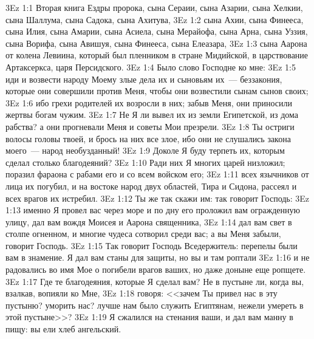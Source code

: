 \vs 3Ez 1:1 Вторая книга Ездры пророка, сына Сераии, сына Азарии, сына Хелкии, сына Шаллума, сына Садока, сына Ахитува,
\vs 3Ez 1:2 сына Ахии, сына Финееса, сына Илия, сына Амарии, сына Асиела, сына Мерайофа, сына Арна, сына Уззия, сына Ворифа, сына Авишуя, сына Финееса, сына Елеазара,
\vs 3Ez 1:3 сына Аарона от колена Левиина, который был пленником в стране Мидийской, в царствование Артаксеркса, царя Персидского.
\rsbpar\vs 3Ez 1:4 Было слово Господне ко мне:
\vs 3Ez 1:5 иди и возвести народу Моему злые дела их и сыновьям их~--- беззакония, которые они совершили против Меня, чтобы они возвестили сынам сынов своих;
\vs 3Ez 1:6 ибо грехи родителей их возросли в них; забыв Меня, они приносили жертвы богам чужим.
\vs 3Ez 1:7 Не Я ли вывел их из земли Египетской, из дома рабства? а они прогневали Меня и советы Мои презрели.
\vs 3Ez 1:8 Ты остриги волосы головы твоей, и брось на них все злое, ибо они не слушались закона моего~--- народ необузданный!
\vs 3Ez 1:9 Доколе Я буду терпеть их, которым сделал столько благодеяний?
\vs 3Ez 1:10 Ради них Я многих царей низложил; поразил фараона с рабами его и со всем войском его;
\vs 3Ez 1:11 всех язычников от лица их погубил, и на востоке народ двух областей, Тира и Сидона, рассеял и всех врагов их истребил.
\vs 3Ez 1:12 Ты же так скажи им: так говорит Господь:
\vs 3Ez 1:13 именно Я провел вас через море и по дну его проложил вам огражденную улицу, дал вам вождя Моисея и Аарона священника,
\vs 3Ez 1:14 дал вам свет в столпе огненном, и многие чудеса сотворил среди вас; а вы Меня забыли, говорит Господь.
\rsbpar\vs 3Ez 1:15 Так говорит Господь Вседержитель: перепелы были вам в знамение. Я дал вам станы для защиты, но вы и там роптали
\vs 3Ez 1:16 и не радовались во имя Мое о погибели врагов ваших, но даже доныне еще ропщете.
\vs 3Ez 1:17 Где те благодеяния, которые Я сделал вам? Не в пустыне ли, когда вы, взалкав, вопияли ко Мне,
\vs 3Ez 1:18 говоря: <<зачем Ты привел нас в эту пустыню? уморить нас? лучше нам было служить Египтянам, нежели умереть в этой пустыне>>?
\vs 3Ez 1:19 Я сжалился на стенания ваши, и дал вам манну в пищу: вы ели хлеб ангельский.
